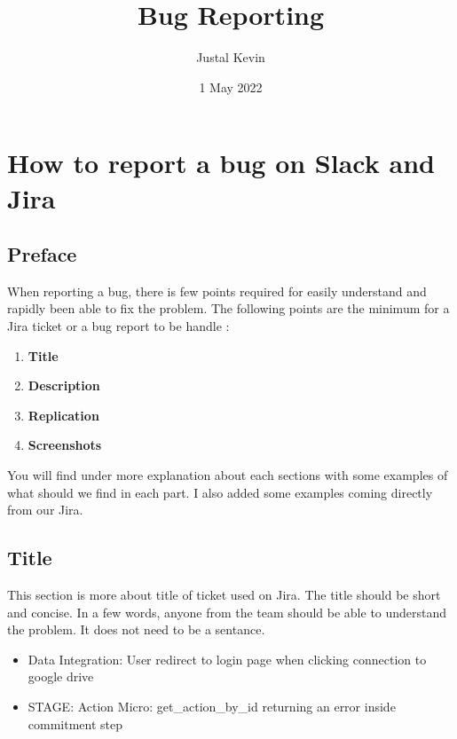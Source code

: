 \documentclass[a4paper,article,oneside]{memoir}
\title{\textbf{Bug Reporting}}
\author{Justal Kevin}
\date{1 May 2022}
\begin{document}
\maketitle
\thispagestyle{empty}
\renewcommand{\contentsname}{Table of contents}
\tableofcontents*
\part{How to report a bug on Slack and Jira}
	\chapter*{Preface}
		When reporting a bug, there is few points required for easily understand and rapidly been able to fix the problem. The following points are the minimum for a Jira ticket or a bug report to be handle :
	
        \begin{enumerate}
  			\item {\color{BrickRed}\textbf{Title}}
  			\item {\color{BrickRed}\textbf{Description}}
  			\item {\color{BrickRed}\textbf{Replication}}
  			\item {\color{BrickRed}\textbf{Screenshots}}
		\end{enumerate}
		
	You will find under more explanation about each sections with some examples of what should we find in each part. I also added some examples coming directly from our Jira.
		\chapter{Title}
		This section is more about title of ticket used on Jira. The title should be short and concise. In a few words, anyone from the team should be able to understand the problem. It does not need to be a sentance.
		
\noindent{}

\begin{itemize}
  \item Data Integration: User redirect to login page when clicking connection to google drive
  \item STAGE: Action Micro: get\_action\_by\_id returning an error inside commitment step
\end{itemize}

\noindent{}
\end{document}
